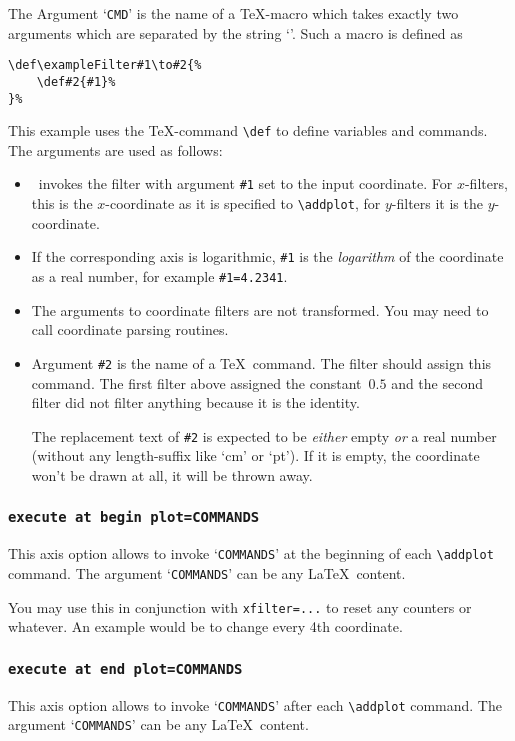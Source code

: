 The Argument `\texttt{CMD}' is the name of a \TeX-macro which takes exactly two arguments which are separated by the string `\texttt{\string\to}'. Such a macro is defined as
\begin{lstlisting}
\def\exampleFilter#1\to#2{%
	\def#2{#1}%
}%
\end{lstlisting}
This example uses the \TeX-command \lstinline!\def! to define variables and commands. The arguments are used as follows:
\begin{itemize}
	\item \PGFPlots\ invokes the filter with argument \texttt{\#1} set to the input coordinate. For $x$-filters, this is the $x$-coordinate as it is specified to \lstinline!\addplot!, for $y$-filters it is the $y$-coordinate.
	\item If the corresponding axis is logarithmic, \texttt{\#1} is the \emph{logarithm} of the coordinate as a real number, for example \texttt{\#1=4.2341}.
	\item The arguments to coordinate filters are not transformed. You may need to call coordinate parsing routines.
	\item Argument \texttt{\#2} is the name of a \TeX\ command. The filter should assign this command. The first filter above assigned the constant~$0.5$ and the second filter did not filter anything because it is the identity.

	The replacement text of \texttt{\#2} is expected to be \emph{either} empty \emph{or} a real number (without any length-suffix like `cm' or `pt'). If it is empty, the coordinate won't be drawn at all, it will be thrown away.
\end{itemize}

\subsubsection{\texttt{execute at begin plot=COMMANDS}}
This axis option allows to invoke `\texttt{COMMANDS}' at the beginning of each \lstinline!\addplot! command. The argument `\texttt{COMMANDS}' can be any \LaTeX\ content.

You may use this in conjunction with \texttt{xfilter=...} to reset any counters or whatever. An example would be to change every 4th coordinate.

\subsubsection{\texttt{execute at end plot=COMMANDS}}
This axis option allows to invoke `\texttt{COMMANDS}' after each \lstinline!\addplot! command. The argument `\texttt{COMMANDS}' can be any \LaTeX\ content.
